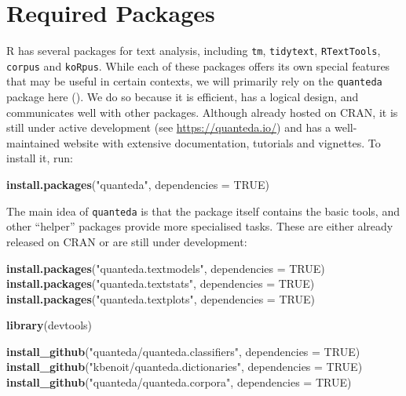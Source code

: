 \documentclass[
]{book}
\newenvironment{Shaded}{\begin{snugshade}}{\end{snugshade}}
\newcommand{\AttributeTok}[1]{\textcolor[rgb]{0.13,0.29,0.53}{#1}}
\newcommand{\ConstantTok}[1]{\textcolor[rgb]{0.56,0.35,0.01}{#1}}
\newcommand{\FunctionTok}[1]{\textcolor[rgb]{0.13,0.29,0.53}{\textbf{#1}}}
\newcommand{\NormalTok}[1]{#1}
\newcommand{\StringTok}[1]{\textcolor[rgb]{0.31,0.60,0.02}{#1}}
\begin{document}
\section{Required Packages}\label{required}

R has several packages for text analysis, including \texttt{tm}, \texttt{tidytext}, \texttt{RTextTools}, \texttt{corpus} and \texttt{koRpus}. While each of these packages offers its own special features that may be useful in certain contexts, we will primarily rely on the \texttt{quanteda} package here (). We do so because it is efficient, has a logical design, and communicates well with other packages. Although already hosted on CRAN, it is still under active development (see \url{https://quanteda.io/}) and has a well-maintained website with extensive documentation, tutorials and vignettes. To install it, run:

\begin{Shaded}
\begin{Highlighting}[]
\FunctionTok{install.packages}\NormalTok{(}\StringTok{"quanteda"}\NormalTok{, }\AttributeTok{dependencies =} \ConstantTok{TRUE}\NormalTok{)}
\end{Highlighting}
\end{Shaded}

The main idea of \texttt{quanteda} is that the package itself contains the basic tools, and other ``helper'' packages provide more specialised tasks. These are either already released on CRAN or are still under development:

\begin{Shaded}
\begin{Highlighting}[]
\FunctionTok{install.packages}\NormalTok{(}\StringTok{"quanteda.textmodels"}\NormalTok{, }\AttributeTok{dependencies =} \ConstantTok{TRUE}\NormalTok{)}
\FunctionTok{install.packages}\NormalTok{(}\StringTok{"quanteda.textstats"}\NormalTok{, }\AttributeTok{dependencies =} \ConstantTok{TRUE}\NormalTok{)}
\FunctionTok{install.packages}\NormalTok{(}\StringTok{"quanteda.textplots"}\NormalTok{, }\AttributeTok{dependencies =} \ConstantTok{TRUE}\NormalTok{)}

\FunctionTok{library}\NormalTok{(devtools)}

\FunctionTok{install\_github}\NormalTok{(}\StringTok{"quanteda/quanteda.classifiers"}\NormalTok{, }\AttributeTok{dependencies =} \ConstantTok{TRUE}\NormalTok{)}
\FunctionTok{install\_github}\NormalTok{(}\StringTok{"kbenoit/quanteda.dictionaries"}\NormalTok{, }\AttributeTok{dependencies =} \ConstantTok{TRUE}\NormalTok{) }
\FunctionTok{install\_github}\NormalTok{(}\StringTok{"quanteda/quanteda.corpora"}\NormalTok{, }\AttributeTok{dependencies =} \ConstantTok{TRUE}\NormalTok{) }
\end{Highlighting}
\end{Shaded}
\end{document}
